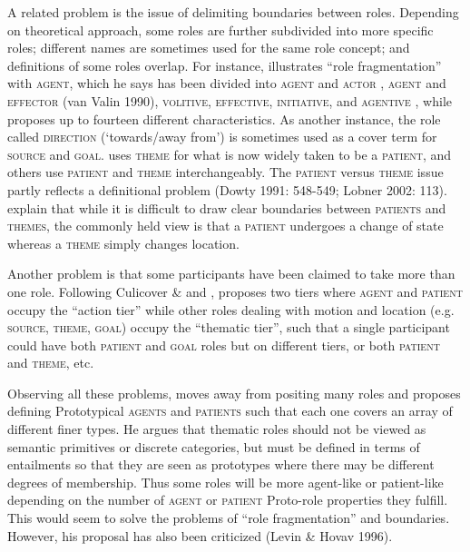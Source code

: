 \documentclass[output=paper]{langsci/langscibook}
\begin{document}
A related problem is the issue of delimiting boundaries between roles. Depending on theoretical approach, some roles are further subdivided into more specific roles; different names are sometimes used for the same role concept; and definitions of some roles overlap. For instance, \citet[553]{Dowty1991} illustrates “role fragmentation” with \textsc{agent,} which he says has been divided into \textsc{agent} and \textsc{actor} \citep{Jackendoff1983}, \textsc{agent} and \textsc{effector} (van Valin 1990), \textsc{volitive}, \textsc{effective}, \textsc{initiative}, and \textsc{agentive} \citep{Cruse1973}, while \citet{Lakoff1977} proposes up to fourteen different characteristics. As another instance, the role called \textsc{direction} (‘towards/away from’) is sometimes used as a cover term for \textsc{source} and \textsc{goal. }\citet{Anderson1977} uses \textsc{theme} for what is now widely taken to be a \textsc{patient}, and others use \textsc{patient} and \textsc{theme} interchangeably. The \textsc{patient} versus \textsc{theme} issue partly reflects a definitional problem (Dowty\textit{ }1991: 548-549; Lobner 2002: 113). \citet[5]{PalmerEtAl2010} explain that while it is difficult to draw clear boundaries between \textsc{patients} and \textsc{themes,} the commonly held view is that a \textsc{patient} undergoes a change of state whereas a \textsc{theme} simply changes location.

Another problem is that some participants have been claimed to take more than one role. Following Culicover \& \citet{Wilkins1986} and \citet{Talmy1985}, \citet[395]{Jackendoff1987} proposes two tiers where \textsc{agent} and \textsc{patient} occupy the “action tier” while other roles dealing with motion and location (e.g. \textsc{source, theme, goal}) occupy the “thematic tier”, such that a single participant could have both \textsc{patient} and \textsc{goal} roles but on different tiers, or both \textsc{patient} and \textsc{theme}, etc.

  Observing all these problems, \citet{Dowty1991} moves away from positing many roles and proposes defining Prototypical \textsc{agents} and \textsc{patient}\textsc{s} such that each one covers an array of different finer types. He argues that thematic roles should not be viewed as semantic primitives or discrete categories, but must be defined in terms of entailments so that they are seen as prototypes where there may be different degrees of membership. Thus some roles will be more agent-like or patient-like depending on the number of \textsc{agent} or \textsc{patient} Proto-role properties they fulfill. This would seem to solve the problems of “role fragmentation” and boundaries. However, his proposal has also been criticized (Levin \& Hovav 1996).
\end{document}

